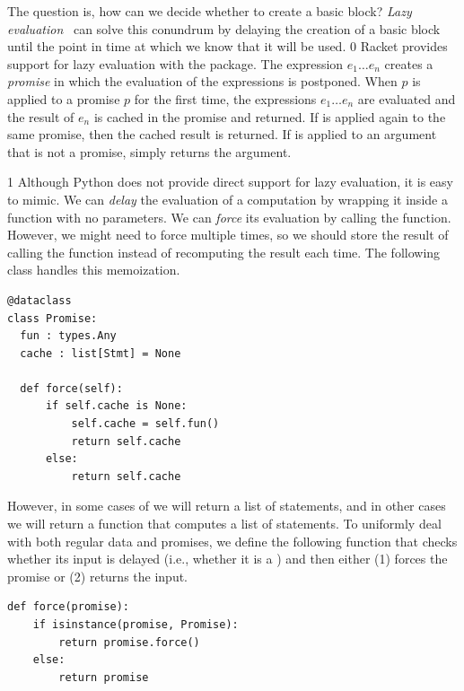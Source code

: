 \documentclass[7x10]{TimesAPriori_MIT}%
\def\racketEd{0}
\def\pythonEd{1}
\def\edition{1}
\newcommand{\pythonColor}[0]{}
\numberwithin{theorem}{chapter}
\numberwithin{definition}{chapter}
\numberwithin{equation}{chapter}
\begin{document}
The question is, how can we decide whether to create a basic block?
\emph{Lazy evaluation}~\citep{Friedman:1976aa} can solve this conundrum by
delaying the creation of a basic block until the point in time at which
we know that it will be used.
%
{\if\edition\racketEd
%
Racket provides support for
lazy evaluation with the
\href{https://docs.racket-lang.org/reference/Delayed_Evaluation.html}{}
package. The expression  $e_1 \ldots e_n$\key{)}
 creates a
\emph{promise} in which the evaluation of the
expressions is postponed. When 
$p$\key{)} is applied to a promise $p$ for the
first time, the expressions $e_1 \ldots e_n$ are evaluated and the
result of $e_n$ is cached in the promise and returned. If 
is applied again to the same promise, then the cached result is
returned.  If  is applied to an argument that is not a
promise,  simply returns the argument.
%
\fi}
%
{\if\edition\pythonEd\pythonColor
Although Python does not provide direct support for lazy evaluation, it
is easy to mimic. We can \emph{delay} the evaluation of a computation
by wrapping it inside a function with no parameters. We can
\emph{force} its evaluation by calling the function. However, we might
need to force multiple times, so we should store the result of
calling the function instead of recomputing the result each time.
The following  class handles this memoization.
%
\begin{lstlisting}
@dataclass
class Promise:
  fun : types.Any
  cache : list[Stmt] = None

  def force(self):
      if self.cache is None:
          self.cache = self.fun()
          return self.cache
      else:
          return self.cache
\end{lstlisting}
%
However, in some cases of  we will return a list
of statements, and in other cases we will return a function that
computes a list of statements.  To uniformly deal with both regular
data and promises, we define the following  function that
checks whether its input is delayed (i.e., whether it is a
) and then either (1) forces the promise or (2) returns
the input.
%
\begin{lstlisting}
def force(promise):
    if isinstance(promise, Promise):
        return promise.force()
    else:
        return promise
\end{lstlisting}
%
\fi}
\end{document}
